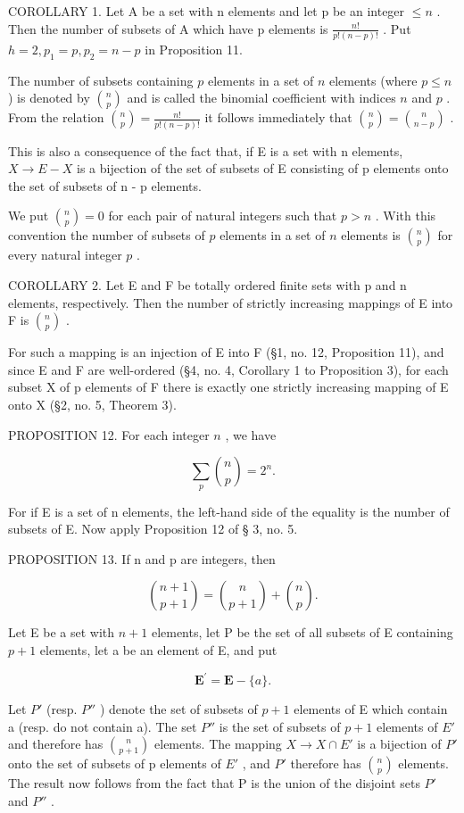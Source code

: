 COROLLARY 1. Let A be a set with n elements and let p be an integer \(\leqslant n\) . Then the number of subsets of A which have p elements is \(\frac{n!}{p!(n-p)!}\) . Put \(h=2, p_{1}=p, p_{2}=n-p\) in Proposition 11.

The number of subsets containing \(p\) elements in a set of \(n\) elements (where \(p \leqslant n\) ) is denoted by \(\binom{n}{p}\) and is called the binomial coefficient with indices \(n\) and \(p\) . From the relation \(\binom{n}{p} = \frac{n!}{p!(n - p)!}\) it follows immediately that \(\binom{n}{p} = \binom{n}{n - p}\) .

This is also a consequence of the fact that, if E is a set with n elements, \(X \rightarrow E - X\) is a bijection of the set of subsets of E consisting of p elements onto the set of subsets of n - p elements.

We put \(\binom{n}{p} = 0\) for each pair of natural integers such that \(p > n\) . With this convention the number of subsets of \(p\) elements in a set of \(n\) elements is \(\binom{n}{p}\) for every natural integer \(p\) .

COROLLARY 2. Let E and F be totally ordered finite sets with p and n elements, respectively. Then the number of strictly increasing mappings of E into F is \(\binom{n}{p}\) .

For such a mapping is an injection of E into F (§1, no. 12, Proposition 11), and since E and F are well-ordered (§4, no. 4, Corollary 1 to Proposition 3), for each subset X of p elements of F there is exactly one strictly increasing mapping of E onto X (§2, no. 5, Theorem 3).

PROPOSITION 12. For each integer \(n\) , we have

\[
\sum_ {p} \binom{n}{p} = 2 ^ {n}.
\]

For if E is a set of n elements, the left-hand side of the equality is the number of subsets of E. Now apply Proposition 12 of § 3, no. 5.

PROPOSITION 13. If n and p are integers, then

\[
\binom {n + 1} {p + 1} = \binom {n} {p + 1} + \binom {n} {p}.
\]

Let E be a set with \(n + 1\) elements, let P be the set of all subsets of E containing \(p + 1\) elements, let a be an element of E, and put

\[
\mathbf {E} ^ {\prime} = \mathbf {E} - \{a \}.
\]

Let \(P'\) (resp. \(P''\) ) denote the set of subsets of \(p + 1\) elements of E which contain a (resp. do not contain a). The set \(P''\) is the set of subsets of \(p + 1\) elements of \(E'\) and therefore has \(\binom{n}{p+1}\) elements. The mapping \(X \to X \cap E'\) is a bijection of \(P'\) onto the set of subsets of p elements of \(E'\) , and \(P'\) therefore has \(\binom{n}{p}\) elements. The result now follows from the fact that P is the union of the disjoint sets \(P'\) and \(P''\) .

